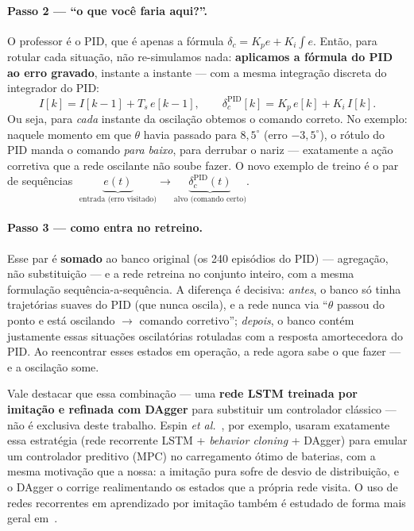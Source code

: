 \documentclass[11pt,a4paper]{article}
\begin{document}
\paragraph{Passo 2 --- ``o que você faria aqui?''.} O professor é o PID, que é apenas a
fórmula $\delta_c=K_p e+K_i\!\int e$. Então, para rotular cada situação, não
re-simulamos nada: \textbf{aplicamos a fórmula do PID ao erro gravado}, instante a
instante --- com a mesma integração discreta do integrador do PID:
\[
  I[k]=I[k-1]+T_s\,e[k-1], \qquad
  \delta_c^{\mathrm{PID}}[k]=K_p\,e[k]+K_i\,I[k].
\]
Ou seja, para \emph{cada} instante da oscilação obtemos o comando correto. No exemplo:
naquele momento em que $\theta$ havia passado para $8{,}5^\circ$ (erro $-3{,}5^\circ$),
o rótulo do PID manda o comando \emph{para baixo}, para derrubar o nariz --- exatamente
a ação corretiva que a rede oscilante não soube fazer. O novo exemplo de treino é o par
de sequências $\;\underbrace{e(t)}_{\text{entrada (erro visitado)}}\longrightarrow
\underbrace{\delta_c^{\mathrm{PID}}(t)}_{\text{alvo (comando certo)}}$.

\paragraph{Passo 3 --- como entra no retreino.} Esse par é \textbf{somado} ao banco
original (os 240 episódios do PID) --- agregação, não substituição --- e a rede retreina
no conjunto inteiro, com a mesma formulação sequência-a-sequência. A diferença é
decisiva: \emph{antes}, o banco só tinha trajetórias suaves do PID (que nunca oscila), e
a rede nunca via ``$\theta$ passou do ponto e está oscilando $\to$ comando corretivo'';
\emph{depois}, o banco contém justamente essas situações oscilatórias rotuladas com a
resposta amortecedora do PID. Ao reencontrar esses estados em operação, a rede agora
sabe o que fazer --- e a oscilação some.

Vale destacar que essa combinação --- uma \textbf{rede LSTM treinada por imitação e
refinada com DAgger} para substituir um controlador clássico --- não é exclusiva deste
trabalho. Espin \emph{et al.}~\cite{espin2024}, por exemplo, usaram exatamente essa
estratégia (rede recorrente LSTM + \emph{behavior cloning} + DAgger) para emular um
controlador preditivo (MPC) no carregamento ótimo de baterias, com a mesma motivação
que a nossa: a imitação pura sofre de desvio de distribuição, e o DAgger o corrige
realimentando os estados que a própria rede visita. O uso de redes recorrentes em
aprendizado por imitação também é estudado de forma mais geral em~\cite{nguyen2016}.
\end{document}
